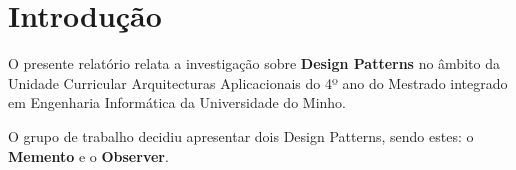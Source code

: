 \section{Introdução}
\label{sec:introducao}

\hspace{5mm} O presente relatório relata a investigação sobre \textbf{Design Patterns} no âmbito da Unidade Curricular Arquitecturas Aplicacionais do 4º ano do Mestrado integrado em Engenharia Informática da Universidade do Minho.

\hspace{2mm} O grupo de trabalho decidiu apresentar dois Design Patterns, sendo estes: o \textbf{Memento} e o \textbf{Observer}.


